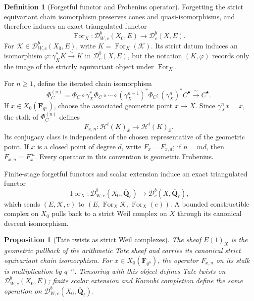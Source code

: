 \documentclass[10pt]{article}
\newtheorem{proposition}[theorem]{Proposition}
\theoremstyle{definition}
\newtheorem{definition}[theorem]{Definition}
\newcommand{\Qlb}{\overline{\mathbf Q}_\ell}
\newcommand{\Dbc}{\mathcal D^b_c}
\begin{document}
\begin{definition}[Forgetful functor and Frobenius operator]
Forgetting the strict equivariant chain isomorphism preserves cones and
quasi-isomorphisms, and therefore induces an exact triangulated functor
\[
 \operatorname{For}_X:\mathcal D^b_{W,c}(X_0,E)
 \longrightarrow\Dbc(X,E).
\]
For \(\mathcal K\in\mathcal D^b_{W,c}(X_0,E)\), write
\(K=\operatorname{For}_X(\mathcal K)\).  Its strict datum induces an
isomorphism \(\varphi:\gamma_X^*K\xrightarrow{\sim}K\) in
\(\Dbc(X,E)\), but the notation \((K,\varphi)\) records only the image of
the strictly equivariant object under \(\operatorname{For}_X\).

For \(n\geq1\), define the iterated chain isomorphism
\[
 \Phi_C^{(n)}=\Phi_C\circ\gamma_X^*\Phi_C\circ\cdots\circ
 (\gamma_X^{n-1})^*\Phi_C:
 (\gamma_X^n)^*C^\bullet\xrightarrow{\ \sim\ }C^\bullet.
\]
If \(x\in X_0(\mathbf F_{q^n})\), choose the associated geometric point
\(\bar x\to X\).  Since \(\gamma_X^n\bar x=\bar x\), the stalk of
\(\Phi_C^{(n)}\) defines
\[
 F_{x,n}:\mathcal H^i(K)_{\bar x}\longrightarrow
          \mathcal H^i(K)_{\bar x}.
\]
Its conjugacy class is independent of the chosen representative of the
geometric point.  If \(x\) is a closed point of degree \(d\), write
\(F_x=F_{x,d}\); if \(n=md\), then \(F_{x,n}=F_x^m\).  Every operator in
this convention is geometric Frobenius.

Finite-stage forgetful functors and scalar extension induce an exact
triangulated functor
\[
 \operatorname{For}_X:\mathcal D^b_{W,c}(X_0,\Qlb)
 \longrightarrow\Dbc(X,\Qlb),
\]
which sends \((E,\mathcal K,e)\) to
\((E,\operatorname{For}_X\mathcal K,\operatorname{For}_X(e))\).
A bounded
constructible complex on \(X_0\) pulls back to a strict Weil complex on
\(X\) through its canonical descent isomorphism.
\end{definition}

\begin{proposition}[Tate twists as strict Weil complexes]
The sheaf \(E(1)_X\) is the geometric pullback of the arithmetic Tate
sheaf and carries its canonical strict equivariant chain isomorphism.  For
\(x\in X_0(\mathbf F_{q^n})\), the operator \(F_{x,n}\) on its stalk is
multiplication by \(q^{-n}\).  Tensoring with this object defines Tate
twists on \(\mathcal D^b_{W,c}(X_0,E)\); finite scalar extension and
Karoubi completion define the same operation on
\(\mathcal D^b_{W,c}(X_0,\Qlb)\).
\end{proposition}
\end{document}
